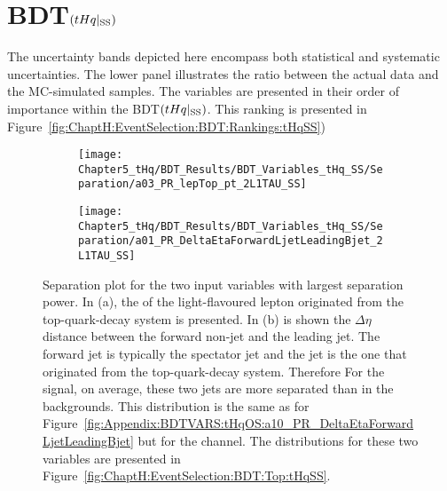 \FloatBarrier

\section{BDT$(tHq|_{\text{SS}})$}
\label{chap:Appendix:BDT_Variables:SS_tHq}
The uncertainty bands depicted here encompass both statistical and systematic uncertainties. 
The lower panel illustrates the ratio between the actual data and the MC-simulated samples.
The variables are presented in their order of importance within the BDT$(tHq|_{\text{SS}})$.
This ranking is presented in Figure~\ref{fig:ChaptH:EventSelection:BDT:Rankings:tHqSS})





\begin{figure}[h]
\centering
\begin{subfigure}{.47\textwidth}
  \centering
  \texttt{[image: Chapter5\_tHq/BDT\_Results/BDT\_Variables\_tHq\_SS/Separation/a03\_PR\_lepTop\_pt\_2L1TAU\_SS]}
\end{subfigure}%
\begin{subfigure}{.47\textwidth}
  \centering
  \texttt{[image: Chapter5\_tHq/BDT\_Results/BDT\_Variables\_tHq\_SS/Separation/a01\_PR\_DeltaEtaForwardLjetLeadingBjet\_2L1TAU\_SS]}
\end{subfigure}
\caption{Separation plot for the two input variables with largest separation power.
In (a), the \pT of the light-flavoured lepton originated from the top-quark-decay system is presented.
In (b) is shown the $\Delta \eta$ distance between the forward non-\btagged jet
and the leading \btagged jet. The forward jet is typically the spectator jet and the \btagged jet is the one that originated
from the top-quark-decay system. Therefore 
For the \tHq signal, on average, these two jets are more separated than in the backgrounds.
This distribution is the same as 
for Figure~\ref{fig:Appendix:BDTVARS:tHqOS:a10_PR_DeltaEtaForwardLjetLeadingBjet} but for
the \dilepSStau channel. The distributions for these two variables are presented in Figure~\ref{fig:ChaptH:EventSelection:BDT:Top:tHqSS}.}
\label{fig:Appendix:BDTVARS:tHqSS:BestTwo}
\end{figure}


